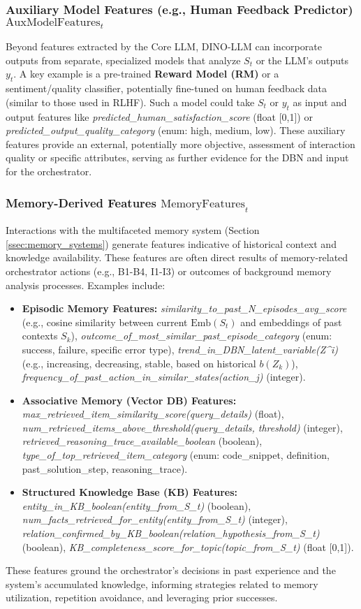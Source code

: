 \documentclass[11pt]{article}
\begin{document}
\subsubsection{Auxiliary Model Features (e.g., Human Feedback Predictor) $\text{AuxModelFeatures}_t$}
\label{sssec:aux_model_features}
Beyond features extracted by the Core LLM, DINO-LLM can incorporate outputs from separate, specialized models that analyze $S_t$ or the LLM's outputs $y_t$. A key example is a pre-trained \textbf{Reward Model (RM)} or a sentiment/quality classifier, potentially fine-tuned on human feedback data (similar to those used in RLHF). Such a model could take $S_t$ or $y_t$ as input and output features like \emph{predicted\_human\_satisfaction_score} (float [0,1]) or \emph{predicted\_output\_quality\_category} (enum: high, medium, low). These auxiliary features provide an external, potentially more objective, assessment of interaction quality or specific attributes, serving as further evidence for the DBN and input for the orchestrator.

\subsubsection{Memory-Derived Features $\text{MemoryFeatures}_t$}
\label{sssec:memory_features}
Interactions with the multifaceted memory system (Section \ref{ssec:memory_systems}) generate features indicative of historical context and knowledge availability. These features are often direct results of memory-related orchestrator actions (e.g., B1-B4, I1-I3) or outcomes of background memory analysis processes. Examples include:
\begin{itemize}
    \item \textbf{Episodic Memory Features:} \emph{similarity\_to\_past\_N\_episodes\_avg\_score} (e.g., cosine similarity between current $\text{Emb}(S_t)$ and embeddings of past contexts $S_k$), \emph{outcome\_of\_most\_similar\_past\_episode\_category} (enum: success, failure, specific error type), \emph{trend\_in\_DBN\_latent\_variable(Z^i)} (e.g., increasing, decreasing, stable, based on historical $b(Z_k)$), \emph{frequency\_of\_past\_action\_in\_similar\_states(action\_j)} (integer).
    \item \textbf{Associative Memory (Vector DB) Features:} \emph{max\_retrieved\_item\_similarity\_score(query\_details)} (float), \emph{num\_retrieved\_items\_above\_threshold(query\_details, threshold)} (integer), \emph{retrieved\_reasoning\_trace\_available\_boolean} (boolean), \emph{type\_of\_top\_retrieved\_item\_category} (enum: code\_snippet, definition, past\_solution\_step, reasoning\_trace).
    \item \textbf{Structured Knowledge Base (KB) Features:} \emph{entity_in_KB_boolean(entity_from_S_t)} (boolean), \emph{num_facts_retrieved_for_entity(entity_from_S_t)} (integer), \emph{relation_confirmed_by_KB_boolean(relation_hypothesis_from_S_t)} (boolean), \emph{KB_completeness_score_for_topic(topic_from_S_t)} (float [0,1]).
\end{itemize}
These features ground the orchestrator's decisions in past experience and the system's accumulated knowledge, informing strategies related to memory utilization, repetition avoidance, and leveraging prior successes.
\end{document}
